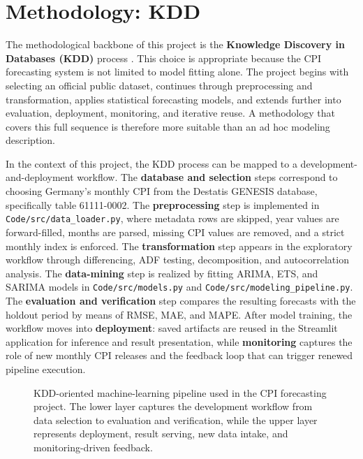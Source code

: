 %
%
%

\chapter{Methodology: KDD}
\label{ch:kdd-methodology}

The methodological backbone of this project is the \textbf{Knowledge Discovery in Databases (KDD)} process \cite{Fayyad:1996}. This choice is appropriate because the CPI forecasting system is not limited to model fitting alone. The project begins with selecting an official public dataset, continues through preprocessing and transformation, applies statistical forecasting models, and extends further into evaluation, deployment, monitoring, and iterative reuse. A methodology that covers this full sequence is therefore more suitable than an ad hoc modeling description.

In the context of this project, the KDD process can be mapped to a development-and-deployment workflow. The \textbf{database and selection} steps correspond to choosing Germany's monthly CPI from the Destatis GENESIS database, specifically table 61111-0002. The \textbf{preprocessing} step is implemented in \texttt{Code/src/data\_loader.py}, where metadata rows are skipped, year values are forward-filled, months are parsed, missing CPI values are removed, and a strict monthly index is enforced. The \textbf{transformation} step appears in the exploratory workflow through differencing, ADF testing, decomposition, and autocorrelation analysis. The \textbf{data-mining} step is realized by fitting ARIMA, ETS, and SARIMA models in \texttt{Code/src/models.py} and \texttt{Code/src/modeling\_pipeline.py}. The \textbf{evaluation and verification} step compares the resulting forecasts with the holdout period by means of RMSE, MAE, and MAPE. After model training, the workflow moves into \textbf{deployment}: saved artifacts are reused in the Streamlit application for inference and result presentation, while \textbf{monitoring} captures the role of new monthly CPI releases and the feedback loop that can trigger renewed pipeline execution.

\begin{figure}[htbp]
    \centering
    
    \caption{KDD-oriented machine-learning pipeline used in the CPI forecasting project. The lower layer captures the development workflow from data selection to evaluation and verification, while the upper layer represents deployment, result serving, new data intake, and monitoring-driven feedback.}
    \label{fig:kdd-ml-pipeline}
\end{figure}


